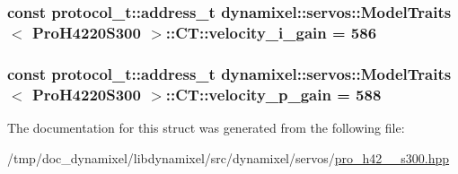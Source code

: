 \subsubsection[{\texorpdfstring{velocity\+\_\+i\+\_\+gain}{velocity_i_gain}}]{\setlength{\rightskip}{0pt plus 5cm}const {\bf protocol\+\_\+t\+::address\+\_\+t} {\bf dynamixel\+::servos\+::\+Model\+Traits}$<$ {\bf Pro\+H4220\+S300} $>$\+::C\+T\+::velocity\+\_\+i\+\_\+gain = 586\hspace{0.3cm}{\ttfamily [static]}}\hypertarget{structdynamixel_1_1servos_1_1_model_traits_3_01_pro_h4220_s300_01_4_1_1_c_t_aa5f3e06352264a1a122678121f49189c}{}\label{structdynamixel_1_1servos_1_1_model_traits_3_01_pro_h4220_s300_01_4_1_1_c_t_aa5f3e06352264a1a122678121f49189c}
\subsubsection[{\texorpdfstring{velocity\+\_\+p\+\_\+gain}{velocity_p_gain}}]{\setlength{\rightskip}{0pt plus 5cm}const {\bf protocol\+\_\+t\+::address\+\_\+t} {\bf dynamixel\+::servos\+::\+Model\+Traits}$<$ {\bf Pro\+H4220\+S300} $>$\+::C\+T\+::velocity\+\_\+p\+\_\+gain = 588\hspace{0.3cm}{\ttfamily [static]}}\hypertarget{structdynamixel_1_1servos_1_1_model_traits_3_01_pro_h4220_s300_01_4_1_1_c_t_a73974dab9abd81e1aec7c4acf1a581cb}{}\label{structdynamixel_1_1servos_1_1_model_traits_3_01_pro_h4220_s300_01_4_1_1_c_t_a73974dab9abd81e1aec7c4acf1a581cb}


The documentation for this struct was generated from the following file\+:\begin{DoxyCompactItemize}
\item 
/tmp/doc\+\_\+dynamixel/libdynamixel/src/dynamixel/servos/\hyperlink{pro__h42__20__s300_8hpp}{pro\+\_\+h42\+\_\+\_\+s300.\+hpp}\end{DoxyCompactItemize}
